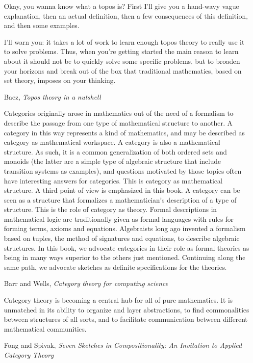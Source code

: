 \documentclass[11pt]{book}
\begin{document}
\epigraph{Okay, you wanna know what a topos is? 
First I'll give you a hand-wavy vague explanation, 
then an actual definition, 
then a few consequences of this definition, 
and then some examples.
\par
I'll warn you: 
it takes a lot of work to learn enough topos theory 
to really use it to solve problems. 
Thus, when you're getting started the main reason to learn 
about it should not be to quickly solve some specific problems, 
but to broaden your horizons and break out of the box 
that traditional mathematics, based on set theory, 
imposes on your thinking.}
{Baez, \textit{Topos theory in a 
nutshell}~\cite{baez_2017_topos_nutshell}}

\pagebreak

\epigraph{Categories originally arose in mathematics out of the need of a formalism to
describe the passage from one type of mathematical structure to another. A
category in this way represents a kind of mathematics, and may be described
as category as mathematical workspace.
A category is also a mathematical structure. As such, it is a common
generalization of both ordered sets and monoids (the latter are a simple
type of algebraic structure that include transition systems as examples),
and questions motivated by those topics often have interesting answers for
categories. This is category as mathematical structure.
A third point of view is emphasized in this book. A category can be seen
as a structure that formalizes a mathematician's description of a type of
structure. This is the role of category as theory. Formal descriptions in
mathematical logic are traditionally given as formal languages with rules for
forming terms, axioms and equations. Algebraists long ago invented a formalism
based on tuples, the method of signatures and equations, to describe
algebraic structures. In this book, we advocate categories in their role as formal
theories as being in many ways superior to the others just mentioned.
Continuing along the same path, we advocate sketches as definite specifications
for the theories.}
{Barr and Wells, \textit{Category theory for computing science}~\cite{barr_wells_2020}}

\epigraph{Category theory is becoming a central hub for all of pure mathematics. It is unmatched
in its ability to organize and layer abstractions, to find commonalities between structures
of all sorts, and to facilitate communication between different mathematical
communities.}
{Fong and Spivak, \textit{Seven Sketches in Compositionality: 
An Invitation to Applied Category Theory}~\cite{fong_spivakd_2018_seven_sketches}}
\end{document}
